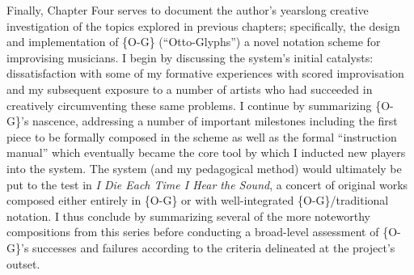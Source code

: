 Finally, Chapter Four serves to document the author's yearslong creative investigation of the topics explored in previous chapters; specifically, the design and implementation of \{O-G\} (``Otto-Glyphs'') a novel notation scheme for improvising musicians.
I begin by discussing the system's initial catalysts: dissatisfaction with some of my formative experiences with scored improvisation and my subsequent exposure to a number of artists who had succeeded in creatively circumventing these same problems.
I continue by summarizing \{O-G\}'s nascence, addressing a number of important milestones including the first piece to be formally composed in the scheme as well as the formal ``instruction manual'' which eventually became the core tool by which I inducted new players into the system.
The system (and my pedagogical method) would ultimately be put to the test in \textit{I Die Each Time I Hear the Sound}, a concert of original works composed either entirely in \{O-G\} or with well-integrated \{O-G\}/traditional notation.
I thus conclude by summarizing several of the more noteworthy compositions from this series before conducting a broad-level assessment of \{O-G\}'s successes and failures according to the criteria delineated at the project's outset.



